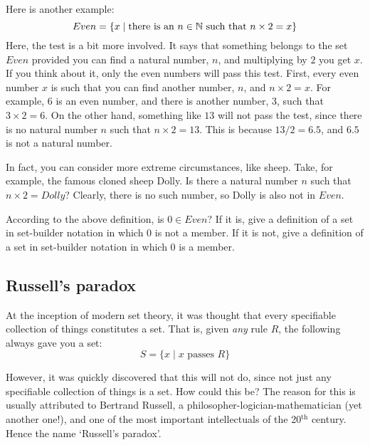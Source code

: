 Here is another example: 
\[
Even=\{x\mid \text{there is an }n \in \mathbb{N}\text{ such that }n \times 2=x\}
\]
Here, the test is a bit more involved. It says that something belongs to the set $Even$ provided you can find a natural number, $n$, and multiplying by $2$ you get $x$. If you think about it, only the even numbers will pass this test. First, every even number $x$ is such that you can find another number, $n$, and $n\times 2=x$. For example, $6$ is an even number, and there is another number, $3$, such that $3 \times 2=6$. On the other hand, something like $13$ will not pass the test, since there is no natural number $n$ such that $n\times 2=13$. This is because $13/2=6.5$, and $6.5$ is not a natural number. 


In fact, you can consider more extreme circumstances, like sheep. Take, for example, the famous cloned sheep Dolly. Is there a natural number $n$ such that $n \times 2=Dolly$? Clearly, there is no such number, so Dolly is also not in $Even$. 

\begin{exc}
	According to the above definition, is $0 \in Even$? If it is, give a definition of a set in set-builder notation in which $0$ is not a member. If it is not, give a definition of a set in set-builder notation in which $0$ is a member. 
\end{exc} 

\subsection{Russell's paradox}

At the inception of modern set theory, it was thought that every specifiable collection of things constitutes a set. That is, given \textit{any} rule $R$, the following always gave you a set:
\[
S=\{x \mid x \text{ passes }R\}
\]

However, it was quickly discovered that this will not do, since not just any specifiable collection of things is a set. How could this be? The reason for this is usually attributed to Bertrand Russell, a philosopher-logician-mathematician (yet another one!), and one of the most important intellectuals of the 20$^\text{th}$ century. Hence the name `Russell's paradox'.

